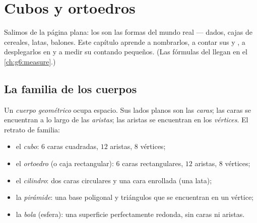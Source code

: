 \chapter{Cubos y ortoedros}\label{ch:g5:solids}

Salimos de la página plana: los  son las formas del mundo real ---
dados, cajas de cereales, latas, balones. Este capítulo aprende a nombrarlos,
a contar sus  y , a desplegarlos en  y a medir
su  contando  pequeños. (Las fórmulas del  llegan en el
\cref{ch:g6:measure}.)

\section{La familia de los cuerpos}

\begin{definition}\label{def:g5:solids:def}
Un \emph{cuerpo geométrico} ocupa espacio. Sus lados planos son las
\emph{caras}; las caras se encuentran a lo largo de las \emph{aristas};
las aristas se encuentran en los \emph{vértices}. El retrato de
familia:
\begin{itemize}
  \item el \emph{cubo}: $6$ caras cuadradas, $12$ aristas,
        $8$ vértices;
  \item el \emph{ortoedro} (o caja rectangular): $6$
        caras rectangulares, $12$ aristas, $8$ vértices;
  \item el \emph{cilindro}: dos caras circulares y una cara enrollada
        (una lata);
  \item la \emph{pirámide}: una base poligonal y triángulos que se encuentran en
        un vértice;
  \item la \emph{bola} (esfera): una superficie perfectamente redonda, sin
        caras ni aristas.
\end{itemize}
\end{definition}

